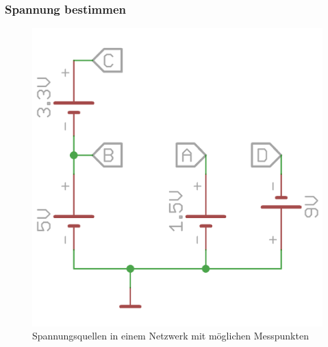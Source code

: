 \begin{frame}
  \frametitle{Spannung bestimmen}
  \begin{center}
    \begin{figure}
      \includegraphics[width=.5\textwidth,height=.75\textheight,keepaspectratio]{e02/Spannung.png}
      \caption{Spannungsquellen in einem Netzwerk mit möglichen Messpunkten}
    \end{figure}
  \end{center}
\end{frame}

